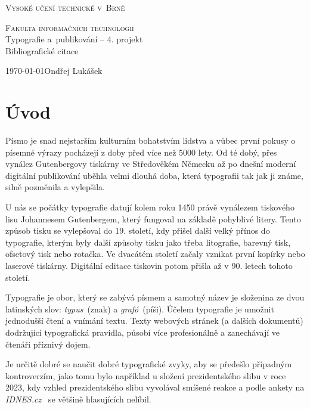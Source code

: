 \documentclass[11pt, a4paper]{article}
\begin{document}
\begin{titlepage}
    \begin{center}
    \Huge \textsc{Vysoké učení technické v~Brně}
    
    \huge \textsc{Fakulta informačních technologií}\\
    {\LARGE Typografie a~publikování -- 4. projekt\\
    \Huge Bibliografické citace}
    \end{center}
    {\Large \today \hfill Ondřej Lukášek}
\end{titlepage}

\section{Úvod}

Písmo je snad nejstarším kulturním bohatstvím lidstva a vůbec první pokusy o písemné výrazy pocházejí z doby před více než 5000 lety. Od té dobý, přes vynález Gutenbergovy tiskárny ve Středověkém Německu až po dnešní moderní digitální publikování uběhla velmi dlouhá doba, která typografii tak jak ji známe, silně pozměnila a vylepšila.~\cite{Lennartz2011}

U nás se počátky typografie datují kolem roku 1450 právě vynálezem tiskového lisu Johannesem Gutenbergem, který fungoval na základě pohyblivé litery. Tento způsob tisku se vylepšoval do 19. století, kdy přišel další velký přínos do typografie, kterým byly další způsoby tisku jako třeba litografie, barevný
tisk, ofsetový tisk nebo rotačka. Ve dvacátém století začaly vznikat první kopírky nebo laserové tiskárny. Digitální editace tiskovin potom přišla až v 90. letech tohoto století.~\cite{Jirasek2015}

\bigskip

\noindent Typografie je obor, který se zabývá písmem a samotný název je složenina ze dvou latinských slov: \emph{typus}~(znak) a \emph{grafó}~(píši). Účelem typografie je umožnit jednodušší čtení a vnímání textu. Texty webových stránek (a dalších dokumentů) dodržující typografická pravidla, působí více profesionálně a zanechávají ve čtenáři příznivý dojem.~\cite{Gorecka2012}

\bigskip

Je určitě dobré se naučit dobré typografické zvyky, aby se předešlo případným kontroverzím, jako tomu bylo například u složení prezidentského slibu v roce 2023, kdy vzhled prezidentského slibu vyvolával smíšené reakce a podle ankety na \textit{IDNES.cz}~\cite{Pukovcova2023} se většině hlasujících nelíbil.
\end{document}
